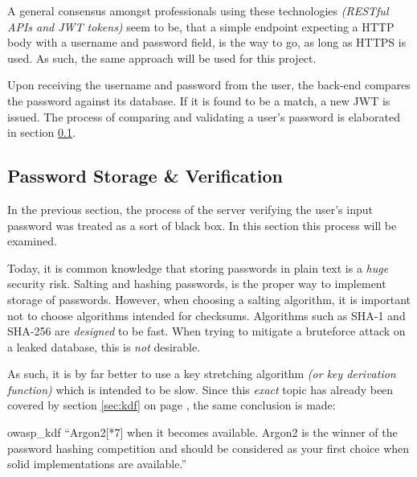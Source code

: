 			A general consensus amongst professionals using these technologies \emph{(RESTful APIs and JWT tokens)} seem to be, that a simple endpoint expecting a HTTP body with a username and password field, is the way to go, as long as HTTPS is used\cite{jwt.io,auth0_jwt,tkalec}. As such, the same approach will be used for this project.

			Upon receiving the username and password from the user, the back-end compares the password against its database. If it is found to be a match, a new JWT is issued. The process of comparing and validating a user's password is elaborated in section \ref{sec:password}.

		\subsection{Password Storage \& Verification}
			\label{sec:password}
			In the previous section, the process of the server verifying the user's input password was treated as a sort of black box. In this section this process will be examined.

			Today, it is common knowledge that storing passwords in plain text is a \emph{huge} security risk. Salting and hashing passwords, is the proper way to implement storage of passwords. However, when choosing a salting algorithm, it is important not to choose algorithms intended for checksums. Algorithms such as SHA-1 and SHA-256 are \emph{designed} to be fast. When trying to mitigate a bruteforce attack on a leaked database, this is \emph{not} desirable.

			As such, it is by far better to use a key stretching algorithm \emph{(or key derivation function)} which is intended to be slow. Since this \emph{exact} topic has already been covered by section \ref{sec:kdf} on page \pageref{sec:kdf}, the same conclusion is made:
			\begin{citequote}{owasp_kdf}
				``Argon2[*7] when it becomes available. Argon2 is the winner of the password hashing competition and should be considered as your first choice when solid implementations are available.''
			\end{citequote}

